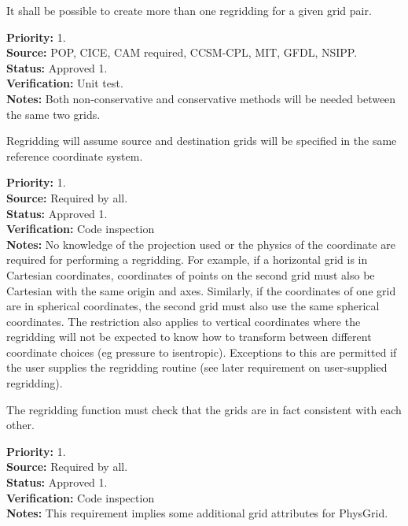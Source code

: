 It shall be possible to create more than one regridding for a given grid
pair.

\begin{reqlist}
{\bf Priority:} 1. \\
{\bf Source:} POP, CICE, CAM required, CCSM-CPL, MIT, GFDL, NSIPP. \\
{\bf Status:} Approved 1. \\
{\bf Verification:} Unit test. \\
{\bf Notes:} Both non-conservative and conservative methods will be needed
             between the same two grids.
\end{reqlist}


Regridding will assume source and destination grids will be
specified in the same reference coordinate system.

\begin{reqlist}
{\bf Priority:} 1. \\
{\bf Source:} Required by all. \\
{\bf Status:} Approved 1. \\
{\bf Verification:} Code inspection  \\
{\bf Notes:} No knowledge of the projection used or the physics of the 
             coordinate are required for performing a regridding.  For example,
             if a horizontal grid is in Cartesian coordinates, coordinates of
             points on the second grid must also be Cartesian with the same 
             origin and axes. Similarly, if the coordinates of one grid are in 
             spherical coordinates, the second grid must also use the same 
             spherical coordinates.  The restriction also applies to vertical 
             coordinates where the regridding will not be expected to know 
             how to transform between different coordinate choices 
             (eg pressure to isentropic).  Exceptions to this are permitted 
             if the user supplies the regridding routine (see later
             requirement on user-supplied regridding).
\end{reqlist}


The regridding function must check that the grids are in fact consistent
with each other.

\begin{reqlist}
{\bf Priority:} 1. \\
{\bf Source:} Required by all. \\
{\bf Status:} Approved 1. \\
{\bf Verification:} Code inspection  \\
{\bf Notes:} This requirement implies some additional grid attributes for
             PhysGrid. 
\end{reqlist}


